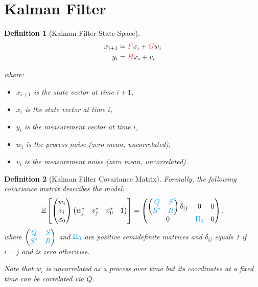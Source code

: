 \documentclass[a4 paper]{article}
\numberwithin{equation}{section}
\theoremstyle{boldStyle}
\theoremstyle{boldBlueStyle}
\theoremstyle{boldPurpleStyle}
\theoremstyle{boldRedStyle}
\newtheorem{definition}{Definition}[section]
\begin{document}
\section{Kalman Filter}


\begin{definition}[Kalman Filter State Space] 
  \begin{equation}
    \begin{aligned}
      x_{i+1} &= \tred{F} x_i + \tred{G} w_i \\
      y_i &= \tred{H} x_i + v_i
    \end{aligned}
  \end{equation}

  where:
\begin{itemize}
    \item \( x_{i+1} \) is the state vector at time \( i+1 \),
    \item \( x_i \) is the state vector at time \( i \),
    \item \( y_i \) is the measurement vector at time \( i \),
    \item \( w_i \) is the process noise (zero mean, uncorrelated),
    \item \( v_i \) is the measurement noise (zero mean, uncorrelated).
\end{itemize}
\end{definition}


\begin{definition}[Kalman Filter Covariance Matrix] 
  Formally, the following covariance matrix describes the model:
  \begin{equation}
      \mathbb{E} \left[
      \begin{pmatrix}
          w_i \\
          v_i \\
          x_0
      \end{pmatrix}
      \begin{pmatrix}
          w_j^* & v_j^* & x_0^* & 1
      \end{pmatrix}
      \right] = 
      \begin{pmatrix}
          \begin{pmatrix}
            \tblu{Q} & \tblu{S} \\
            \tblu{S^*} & \tblu{R}
          \end{pmatrix} \delta_{ij} & 0 & 0 \\
          0 & \tblu{\Pi_0} & 0
      \end{pmatrix},
      \label{eq:covariance_matrix}
  \end{equation}
  where \(
    \begin{pmatrix}
      \tblu{Q} & \tblu{S} \\
      \tblu{S^*} & \tblu{R}
    \end{pmatrix}
  \) and \(\tblu{\Pi_0}\) are positive semidefinite matrices and \(\delta_{ij}\) equals 1 if \(i = j\) and is zero otherwise.
  
  Note that \(w_i\) is uncorrelated as a process over time but its coordinates at a fixed time can be correlated via \(Q\).
\end{definition}
\end{document}
